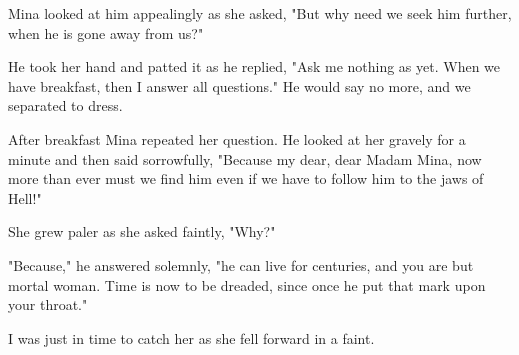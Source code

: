 Mina looked at him appealingly as she asked, "But why need we seek him further, when he is gone away from us?" 

He took her hand and patted it as he replied, "Ask me nothing as yet. When we have breakfast, then I answer all questions." He would say no more, and we separated to dress. 

After breakfast Mina repeated her question. He looked at her gravely for a minute and then said sorrowfully, "Because my dear, dear Madam Mina, now more than ever must we find him even if we have to follow him to the jaws of Hell!" 

She grew paler as she asked faintly, "Why?" 

"Because," he answered solemnly, "he can live for centuries, and you are but mortal woman. Time is now to be dreaded, since once he put that mark upon your throat." 

I was just in time to catch her as she fell forward in a faint. 
